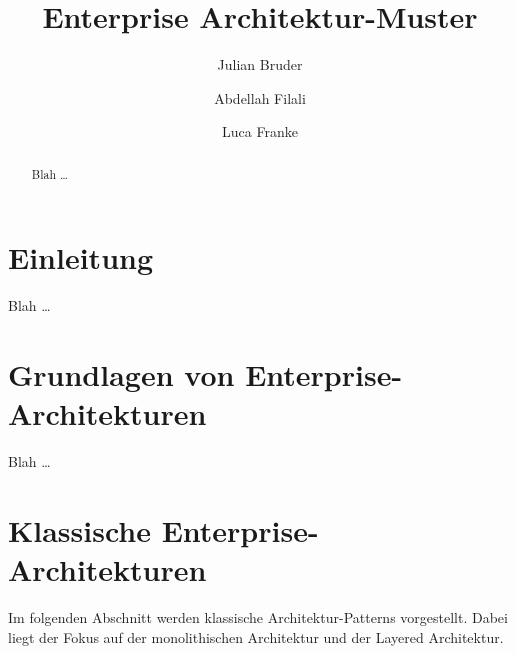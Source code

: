 \documentclass[acmtog]{acmart}
\begin{document}
\title{Enterprise Architektur-Muster}

\author{Julian Bruder}
\author{Abdellah Filali}
\authornotemark[1]
\author{Luca Franke}
\authornotemark[1]
\renewcommand{\shortauthors}{Bruder, Filali, Franke}

\begin{abstract}
Blah \ldots
\end{abstract}

\maketitle

\section{Einleitung}
Blah \ldots

\section{Grundlagen von Enterprise-Architekturen}
Blah \ldots

\section{Klassische Enterprise-Architekturen}
Im folgenden Abschnitt werden klassische Architektur-Patterns vorgestellt. Dabei liegt der Fokus auf der monolithischen 
Architektur und der Layered Architektur.
\end{document}
